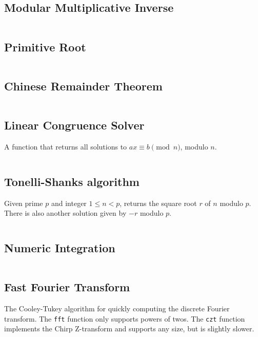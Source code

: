 \documentclass[9pt,a4paper,twocolumn,landscape,oneside]{amsart}
\newcommand{\code}[1]{\inputminted{cpp}{_code/#1}}
\newif\ifverbose
\begin{document}
    \subsection{Modular Multiplicative Inverse}
        \ifverbose
        A function to find a modular multiplicative inverse. Alternatively use
        \texttt{mod\_{}pow(a,m-2,m)} when $m$ is prime.
        \fi
        \code{mathematics/mod_inv.cpp}

    \subsection{Primitive Root}
        \code{mathematics/primitive_root.cpp}

    \subsection{Chinese Remainder Theorem}
        \ifverbose
        An implementation of the Chinese Remainder Theorem.
        \fi
        \code{mathematics/crt.cpp}

    \subsection{Linear Congruence Solver}
        A function that returns all solutions to $ax \equiv b \pmod{n}$, modulo $n$.
        \code{mathematics/linear_congruence.cpp}

    \subsection{Tonelli-Shanks algorithm}
        Given prime $p$ and integer $1\leq n<p$, returns the square root $r$ of
        $n$ modulo $p$. There is also another solution given by $-r$ modulo
        $p$.
        \code{mathematics/tonelli_shanks.cpp}

    \subsection{Numeric Integration}
        \ifverbose
        Numeric integration using Simpson's rule.
        \fi
        \code{mathematics/numeric_integration.cpp}

    \subsection{Fast Fourier Transform}
        The Cooley-Tukey algorithm for quickly computing the discrete Fourier
        transform. The \texttt{fft} function only supports powers of twos. The
        \texttt{czt} function implements the Chirp Z-transform and supports any
        size, but is slightly slower.
        \code{mathematics/fft.cpp}
\end{document}
